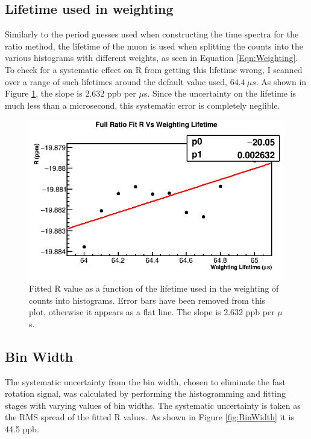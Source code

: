 	\subsection{Lifetime used in weighting}
	\label{SubSec:LifetimeWeighting}

		Similarly to the \gmtwo period guesses used when constructing the time spectra for the ratio method, the lifetime of the muon is used when splitting the counts into the various histograms with different weights, as seen in Equation \ref{Eqn:Weighting}. To check for a systematic effect on R from getting this lifetime wrong, I scanned over a range of such lifetimes around the default value used, $\SI{64.4}{\mu s}$. As shown in Figure \ref{fig:weightingLifetime}, the slope is 2.632 ppb per $\mu$s. Since the uncertainty on the lifetime is much less than a microsecond, this systematic error is completely neglible.

		\begin{figure}[]
			\centering
			\includegraphics[width=.6\textwidth]{RatioCBO_R_Vs_weightingLifetime_Canv}
		    \caption[weightingLifetime]{Fitted R value as a function of the lifetime used in the weighting of counts into histograms. Error bars have been removed from this plot, otherwise it appears as a flat line. The slope is 2.632 ppb per $\mu$s.}
		    \label{fig:weightingLifetime}
		\end{figure}


	\subsection{Bin Width}

		The systematic uncertainty from the bin width, chosen to eliminate the fast rotation signal, was calculated by performing the histogramming and fitting stages with varying values of bin widths. The systematic uncertainty is taken as the RMS spread of the fitted R values. As shown in Figure \ref{fig:BinWidth} it is 44.5 ppb.

